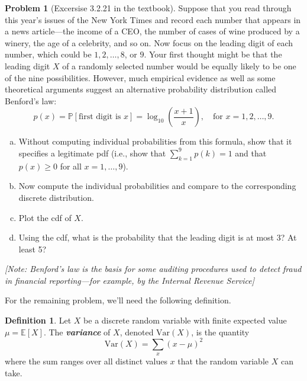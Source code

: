 \documentclass[10pt]{article}
\theoremstyle{definition}
\newtheorem{definition}[theorem]{Definition}
\newtheorem{problem}[theorem]{Problem}
\newcommand{\1}[1]{\textbf{1}_{\left[#1\right]}} %
\def\E{\mathbb{E}} %
\def\P{\mathbb{P}} %
\def\Var{\mathrm{Var}} %
\newcommand{\dempfcolor}[1]{{\color{RoyalBlue}#1}}
\newcommand{\demph}[1]{\dempfcolor{\textit{\textbf{#1}}}}
\begin{document}
\begin{problem}[Excersise 3.2.21 in the textbook]
  Suppose that you read through this year’s issues of the New York Times and
  record each number that appears in a news article---the income of a CEO, the
  number of cases of wine produced by a winery, the age of a
  celebrity, and so on. Now focus on the leading digit of each number, which
  could be $1, 2, \ldots , 8$, or $9$. Your first thought might be that the
  leading digit $X$ of a randomly selected number would be equally likely to
  be one of the nine possibilities. However, much empirical evidence as well
  as some theoretical arguments suggest an alternative probability
  distribution called Benford's law:
  \begin{equation*}
    p(x) = \P\left[\text{first digit is }x \right] = \log_{10}\left(
      \frac{x+1}{x} \right), \quad \text{for }x=1,2,\ldots,9.
  \end{equation*}
  \begin{enumerate}[(a)]
    \item Without computing individual probabilities from this formula, show
    that it specifies a legitimate pdf (i.e., show that $\sum_{k=1}^{9}p(k)=1$
    and that $p(x) \geq 0$ for all $x=1,\ldots,9$).
    \item Now compute the individual probabilities and compare to the
    corresponding discrete distribution.
    \item Plot the cdf of $X$.
    \item Using the cdf, what is the probability that the leading digit is at
    most 3? At least 5?
  \end{enumerate}
  \textit{[Note: Benford's law is the basis for some auditing procedures used
  to detect fraud in financial reporting---for example, by the Internal
  Revenue Service]}
\end{problem}


For the remaining problem, we'll need the following definition.
\begin{definition}
  Let $X$ be a discrete random variable with finite expected value
  $\mu= \E\left[X \right]$. The \demph{variance} of $X$, denoted $\Var(X)$, is
  the quantity
  \begin{equation*}
    \Var(X) = \sum_{x} \left( x- \mu\right)^{2}  
  \end{equation*}
  where the sum ranges over all distinct values $x$ that the random variable
  $X$ can take.
\end{definition}
\end{document}
